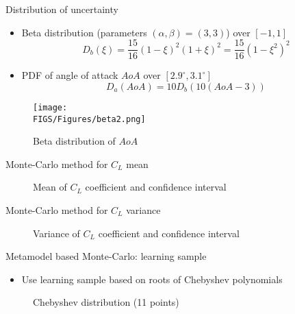 \documentclass[10pt]{beamer}
\def\begit{\begin{itemize}}
\def\endit{\end{itemize}}
\newcommand{\lift}{C_L}
\begin{document}
\begin{frame}{Distribution of uncertainty} 

\begit
\item Beta distribution (parameters $(\alpha,\beta)=(3,3)$) over $[-1,1]$ 
%
$$ D_b(\xi) =\frac{15}{16}(1-\xi)^2(1+\xi)^2=\frac{15}{16}(1-\xi^2)^2$$
%
\item PDF of angle of attack $AoA$ over $[2.9^\circ,3.1^\circ]$
 $$ D_a(AoA) =10 D_b(10(AoA-3)) $$ 
\endit
%
\begin{figure}[!h]
\begin{center}
\texttt{[image: \\FIGS/Figures/beta2.png]}
\caption{Beta distribution of $AoA$}
\end{center}
\end{figure}
%
\end{frame} 
%
%
\begin{frame}{Monte-Carlo method for $\lift$ mean} 
%
\begin{figure}[!h]
\begin{center}
\caption{Mean of $\lift$ coefficient and confidence interval}
\end{center}
\end{figure}
%
\end{frame} 
%
%
\begin{frame}{Monte-Carlo method for $\lift$ variance} 
%
\begin{figure}[!h]
\begin{center}
\caption{Variance of $\lift$ coefficient and confidence interval}
\end{center}
\end{figure}
%
\end{frame} 
%
%
\begin{frame}{Metamodel based Monte-Carlo: learning sample} 
%
\begit
\item Use learning sample based on roots of Chebyshev polynomials
\endit
%
\begin{figure}[!h]
\begin{center}
\caption{Chebyshev distribution (11 points)}
\end{center}
\end{figure}
%
\end{frame} 
\end{document}

